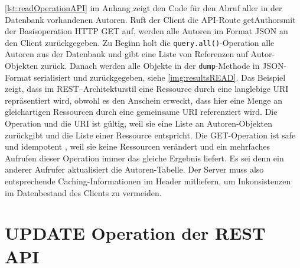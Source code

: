 \documentclass[a4paper,titlepage,halfparskip,12pt,listof=numbered]{scrreprt}
\begin{document}
\begin{onehalfspacing}
\autoref{lst:readOperationAPI} im Anhang zeigt den Code für den Abruf aller in der Datenbank vorhandenen Autoren. Ruft der Client die \ac{API}-Route \glqq getAuthors\grqq mit der Basisoperation \ac{HTTP} GET auf, werden alle Autoren im Format \ac{JSON} an den Client zurückgegeben. Zu Beginn holt die \texttt{query.all()}-Operation alle Autoren aus der Datenbank und gibt eine Liste von Referenzen auf Autor-Objekten zurück. Danach werden alle Objekte in der \texttt{dump}-Methode \cite{marshmallowQuickstart} in \ac{JSON}-Format serialisiert und zurückgegeben, siehe \autoref{img:resultsREAD}. Das Beispiel zeigt, dass im \acs{REST}--Architekturstil eine Ressource durch eine langlebige \acs{URI} repräsentiert wird, obwohl es den Anschein erweckt, dass hier eine Menge an gleichartigen Ressourcen durch eine gemeinsame \acs{URI} referenziert wird. Die Operation und die \acs{URI} ist gültig, weil sie eine Liste an Autoren-Objekten zurückgibt und die Liste einer Ressource entspricht. Die GET-Operation ist safe und idempotent \cite{rahnRESTAPI}, weil sie keine Ressourcen verändert und ein mehrfaches Aufrufen dieser Operation immer das gleiche Ergebnis liefert. Es sei denn ein anderer Aufrufer aktualisiert die Autoren-Tabelle. Der Server muss also entsprechende Caching-Informationen im Header mitliefern, um Inkonsistenzen im Datenbestand des Clients zu vermeiden.

\section{UPDATE Operation der \ac{REST} \ac{API}}
\label{sec:updateAPI}


\end{onehalfspacing}
\end{document}
